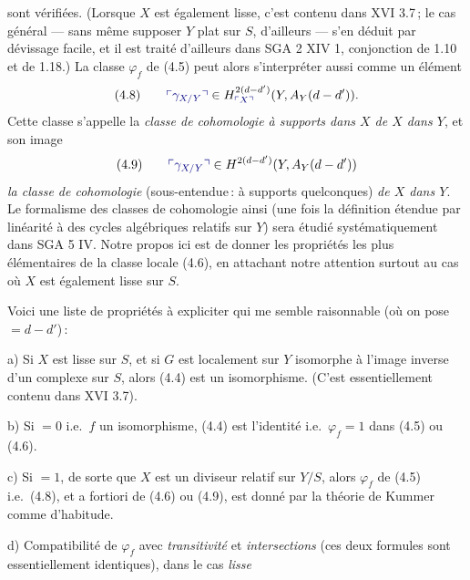 \documentclass[11pt,a4paper]{article}
\begin{document}
sont vérifiées. (Lorsque $X$ est également lisse, c'est contenu dans
XVI 3.7\,; le cas général --- sans même supposer $Y$ plat sur $S$,
d'ailleurs --- s'en déduit par dévissage facile, et il est traité d'ailleurs
dans SGA 2 XIV 1, conjonction de 1.10 et de 1.18.) La classe $\varphi_f$ de
(4.5) peut alors s'interpréter aussi comme un élément
\[
\text{(4.8)}\qquad \add{\gamma_{X/Y}} \in H^{2(d-d')}_{\add{X}}(Y, A_Y(d-d')) .
\]
Cette classe s'appelle la \emph{classe de cohomologie à supports dans $X$
de $X$ dans $Y$}, et son image
\[
\text{(4.9)}\qquad \add{\gamma_{X/Y}} \in H^{2(d-d')}(Y, A_Y(d-d'))
\]
\emph{la classe de cohomologie} (sous-entendue\,: à supports quelconques)
\emph{de $X$ dans $Y$}. Le formalisme des classes de cohomologie
 ainsi   (une fois la
définition étendue par linéarité à des cycles algébriques relatifs sur $Y$)
sera étudié systématiquement dans SGA 5 IV. Notre propos ici est de donner
les propriétés les plus élémentaires de la classe locale (4.6), en attachant
notre attention surtout au cas où $X$ est également lisse sur $S$.

Voici une liste de propriétés à expliciter qui me semble raisonnable (où on
pose   $= d-d'$)\,:

a) Si $X$ est lisse sur $S$, et si $G$ est localement  sur $Y$
isomorphe à l'image inverse d'un complexe sur $S$,  alors (4.4) est un isomorphisme. (C'est essentiellement
contenu dans XVI 3.7).

b) Si  $= 0$ i.e.\ $f$ un isomorphisme, (4.4) est
l'identité i.e.\ $\varphi_f = 1$ dans (4.5) ou (4.6).

c) Si  $= 1$, de sorte que $X$ est un diviseur relatif
sur $Y/S$, alors $\varphi_f$ de (4.5) i.e.\ (4.8), et a fortiori de (4.6)
ou (4.9), est donné par la théorie de Kummer comme d'habitude.

d) Compatibilité de $\varphi_f$ avec \emph{transitivité} et
\emph{intersections} (ces deux formules sont essentiellement identiques),
dans le cas \emph{lisse}
\end{document}
